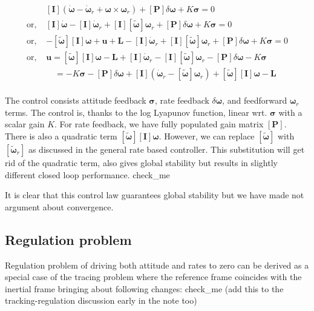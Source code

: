 \documentclass{article}
\begin{document}
\begin{equation}
  \label{eqn_rate_attitude_tracking}
  \begin{split}
    &[\bm{I}](\dot{\bm{\omega}}-\dot{\bm{\omega}}_{r}+\bm{\omega}\times\bm{\omega}_{r} )+[\bm{P}]\delta\bm{\omega}+K\bm{\sigma}=0\\
    \text{or, }&[\bm{I}]\dot{\bm{\omega}}-[\bm{I}]\dot{\bm{\omega}}_{r}+[\bm{I}][\tilde{\bm{\omega}}]\bm{\omega}_{r}+[\bm{P}]\delta\bm{\omega}+K\bm{\sigma}=0\\
    \text{or, }&-[\tilde{\bm{\omega}}][\bm{I}]\bm{\omega}+\bm{u}+\bm{L}-[\bm{I}]\dot{\bm{\omega}}_{r}+[\bm{I}][\tilde{\bm{\omega}}]\bm{\omega}_{r}+[\bm{P}]\delta\bm{\omega}+K\bm{\sigma}=0\\
    \text{or, }&\bm{u} = [\tilde{\bm{\omega}}][\bm{I}]\bm{\omega}-\bm{L}+[\bm{I}]\dot{\bm{\omega}}_{r}-[\bm{I}][\tilde{\bm{\omega}}]\bm{\omega}_{r}-[\bm{P}]\delta\bm{\omega}-K\bm{\sigma}\\
    &\quad=-K\bm{\sigma}-[\bm{P}]\delta\bm{\omega}+[\bm{I}](\dot{\bm{\omega}}_{r}-[\tilde{\bm{\omega}}]\bm{\omega}_{r})+[\tilde{\bm{\omega}}][\bm{I}]\bm{\omega}-\bm{L}\\
  \end{split}
\end{equation}

The control consists attitude feedback $\bm{\sigma}$, rate feedback $\delta{\bm{\omega}}$, and feedforward $\bm{\omega}_{r}$ terms. The control is, thanks to the log Lyapunov function, linear wrt. $\bm{\sigma}$ with a scalar gain $K$. For rate feedback, we have fully populated gain matrix $[\bm{P}]$. There is also a quadratic term $[\tilde{\bm{\omega}}][\bm{I}]\bm{\omega}$. However, we can replace $[\tilde{\bm{\omega}}]$ with $[\tilde{\bm{\omega}}_{r}]$ as discussed in the general rate based controller. This substitution will get rid of the quadratic term, also gives global stability but results in slightly different closed loop performance. check\_me

It is clear that this control law guarantees global stability but we have made not argument about convergence.

\subsection{Regulation problem}
Regulation problem of driving both attitude and rates to zero can be derived as a special case of the tracing problem where the reference frame coincides with the inertial frame bringing about following changes: check\_me (add this to the tracking-regulation discussion early in the note too)
\end{document}
